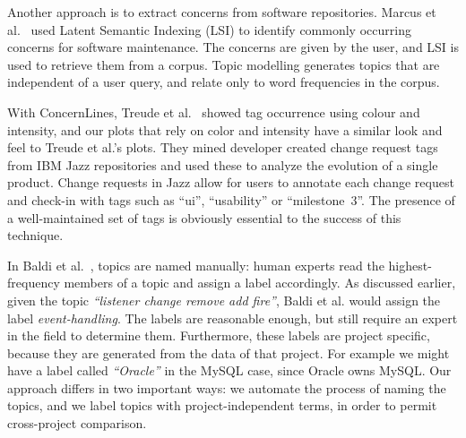 \documentclass[smallextended]{svjour3}       %
\begin{document}
Another approach is to extract concerns from software repositories.
Marcus et al.~\cite{marcus04wcre} used Latent Semantic Indexing (LSI)
to identify commonly occurring concerns for software maintenance. 
The
concerns are given by the user, and LSI is used to retrieve them from
a corpus. 
Topic modelling generates topics that are independent of a user query, and relate only to word frequencies in the corpus.

With ConcernLines, Treude et al.~\cite{treude09cl} showed tag occurrence
using colour and intensity, and our plots that rely on color and intensity
have a similar look and feel to Treude et al.'s plots.
They mined
developer created 
change request tags from IBM Jazz
repositories and used these 
to analyze the evolution of a single product.
Change requests in Jazz allow for users to annotate each change
request and check-in with tags such as ``ui'', ``usability'' or
``milestone~3''. 
The presence of a well-maintained set of tags is obviously essential to the success of this technique.


In Baldi et al.~\cite{Baldi2008}, topics are named manually: human
experts read the highest-frequency members of a topic and assign a
label accordingly. 
As discussed earlier, given the topic \emph{``listener change remove add fire''}, Baldi et al. would assign the label \emph{event-handling}. 
The labels are reasonable enough, but still require an expert in the field to determine them. 
Furthermore, these labels are project specific, because they are
generated from the data of that project. For example we might have a label called \emph{``Oracle''}
in the MySQL case, since Oracle owns MySQL. 
Our approach differs in two important ways: we automate the process of naming the topics, and we label topics with project-independent terms, in order
to permit cross-project comparison.
\end{document}
